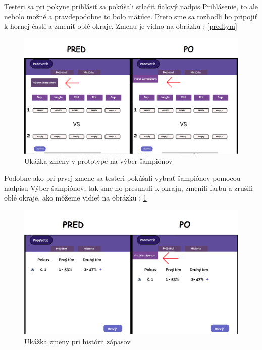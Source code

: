 Testeri sa pri pokyne prihlásiť sa pokúšali stlačiť fialový nadpis Prihlásenie, to ale nebolo možné a pravdepodobne to bolo mätúce. Preto sme sa rozhodli ho pripojiť k hornej časti a zmeniť oblé okraje. Zmenu je vidno na obrázku : \ref{predtym}


\begin{figure}[h!]
	
	\includegraphics[width=.9\textwidth]{figures/2}
	
	\centering
	
	\caption{Ukážka zmeny v prototype na výber šampiónov\label{2}}
	
\end{figure}

	Podobne ako pri prvej zmene sa testeri pokúšali vybrať šampiónov pomocou nadpisu Výber šampiónov, tak sme ho presunuli k okraju, zmenili farbu a zrušili oblé okraje, ako môžeme vidieť na obrázku : \ref{2} 

\begin{figure}[h!]
	
	\includegraphics[width=.9\textwidth]{figures/3}
	
	\centering
	
	\caption{ Ukážka zmeny pri histórii zápasov \label{3}}
	
\end{figure}

